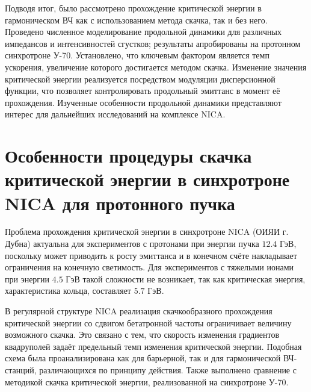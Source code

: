 \par Подводя итог, было рассмотрено прохождение критической энергии в гармоническом ВЧ как с использованием метода скачка, так и без него. Проведено численное моделирование продольной динамики для различных импедансов и интенсивностей сгустков; результаты апробированы на протонном синхротроне У-70. Установлено, что ключевым фактором является темп ускорения, увеличение которого достигается методом скачка. Изменение значения критической энергии реализуется посредством модуляции дисперсионной функции, что позволяет контролировать продольный эмиттанс в момент её прохождения. Изученные особенности продольной динамики представляют интерес для дальнейших исследований на комплексе NICA.

\section{Особенности процедуры скачка критической энергии в синхротроне NICA для протонного пучка}

\par Проблема прохождения критической энергии в синхротроне NICA (ОИЯИ г. Дубна) актуальна для экспериментов с протонами при энергии пучка $12.4$ ГэВ, поскольку может приводить к росту эмиттанса и в конечном счёте накладывает ограничения на конечную светимость. Для экспериментов с тяжелыми ионами при энергии $4.5$ ГэВ такой сложности не возникает, так как критическая энергия, характеристика кольца, составляет $5.7$ ГэВ. 

\par В регулярной структуре NICA реализация скачкообразного прохождения критической энергии со сдвигом бетатронной частоты ограничивает величину возможного скачка. Это связано с тем, что скорость изменения градиентов квадруполей задаёт предельный темп изменения критической энергии. Подобная схема была проанализирована как для барьерной, так и для гармонической ВЧ-станций, различающихся по принципу действия. Также выполнено сравнение с методикой скачка критической энергии, реализованной на синхротроне У-70.

